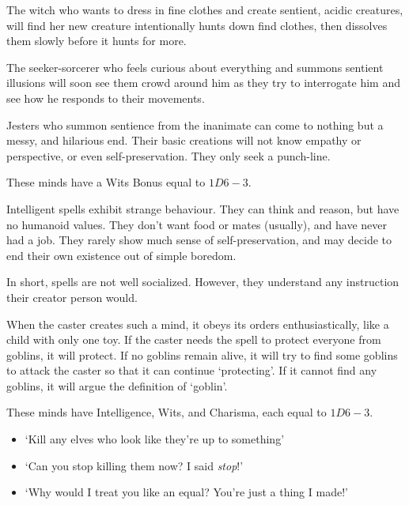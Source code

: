 \begin{multicols}{2}
\begin{exampletext}
The witch who wants to dress in fine clothes and create sentient, acidic creatures, will find her new creature intentionally hunts down find clothes, then dissolves them slowly before it hunts for more.

The seeker-sorcerer who feels curious about everything and summons sentient illusions will soon see them crowd around him as they try to interrogate him and see how he responds to their movements.

Jesters who summon sentience from the inanimate can come to nothing but a messy, and hilarious end.
Their basic creations will not know empathy or perspective, or even self-preservation.
They only seek a punch-line.

\end{exampletext}

These minds have a Wits Bonus equal to $1D6-3$.


Intelligent spells exhibit strange behaviour.
They can think and reason, but have no humanoid values.
They don't want food or mates (usually), and have never had a job.
They rarely show much sense of self-preservation, and may decide to end their own existence out of simple boredom.

In short, spells are not well socialized.
However, they understand any instruction their creator person would.

When the caster creates such a mind, it obeys its orders enthusiastically, like a child with only one toy.
If the caster needs the spell to protect everyone from goblins, it will protect.
If no goblins remain alive, it will try to find some goblins to attack the caster so that it can continue `protecting'.
If it cannot find any goblins, it will argue the definition of `goblin'.

These minds have Intelligence, Wits, and Charisma, each equal to $1D6-3$.

\begin{itemize}
  \item
    `Kill any elves who look like they're up to something'
  \item
    `Can you stop killing them now?
    I said \emph{stop}!'
  \item
    `Why would I treat you like an equal?
    You're just a thing I made!'
\end{itemize}



\end{multicols}

